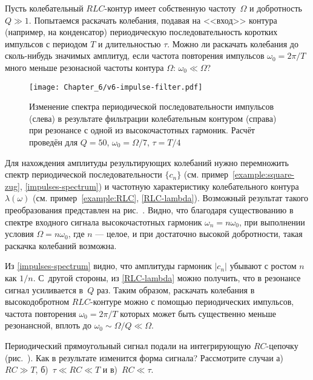 \begin{lab:example}\label{example:zug-RLC}
Пусть колебательный $RLC$-контур имеет собственную
частоту~$\Omega$ и добротность $Q\gg 1$. Попытаемся раскачать колебания,
подавая на <<вход>> контура (например, на конденсатор) периодическую 
последовательность коротких импульсов с периодом $T$ и длительностью 
$\tau$. Можно ли раскачать колебания до сколь-нибудь значимых амплитуд, 
если частота повторения импульсов $\omega_0=2\pi/T$ много меньше 
резонасной частоты контура $\Omega$: $\omega_0\ll \Omega$?

\begin{figure}[h!]
 \centering\texttt{[image: Chapter\_6/v6-impulse-filter.pdf]}
 \caption{\footnotesize Изменение спектра периодической последовательности импульсов (слева)
 в результате фильтрации колебательным контуром (справа) при резонансе с одной
 из высокочастотных гармоник. Расчёт проведён
 для $Q=50$, $\omega_0=\Omega/7$, $\tau=T/4$}
\end{figure}

Для нахождения амплитуды результирующих колебаний нужно перемножить
спектр периодической последовательности $\{c_n\}$
(см. пример~\ref{example:square-zug}, \eqref{impulses-spectrum})
и частотную характеристику колебательного контура $\lambda(\omega)$
(см. пример~\ref{example:RLC}, \eqref{RLC-lambda}).
Возможный результат такого преобразования представлен на рис.~.
Видно, что благодаря существованию в спектре входного сигнала высокочастотных
гармоник $\omega_n = n \omega_0$, при выполнении условия
$\Omega = n \omega_0$, где $n$ --- целое, и при достаточно высокой добротности,
такая раскачка колебаний возможна.

Из \eqref{impulses-spectrum} видно, что амплитуды гармоник $|c_n|$ убывают
с ростом $n$ как $1/n$. С~другой стороны, из \eqref{RLC-lambda} можно получить,
что в резонансе сигнал усиливается в~$Q$ раз.
Таким образом, раскачать колебания в высокодобротном $RLC$-контуре можно
с помощью периодических импульсов, частота повторения $\omega_0=2\pi/T$
которых может быть существенно меньше резонансной,
вплоть до $\omega_0 \sim \Omega / Q \ll \Omega $.
\end{lab:example}

\begin{lab:exercise}
Периодический прямоугольный сигнал подали на интегрирующую $RC$-цепочку
(рис.~). Как в результате изменится форма сигнала?
Рассмотрите случаи а)~$RC \gg T$, б)~$\tau \ll RC \ll T$ и
в)~$RC \ll \tau$.
\end{lab:exercise}

